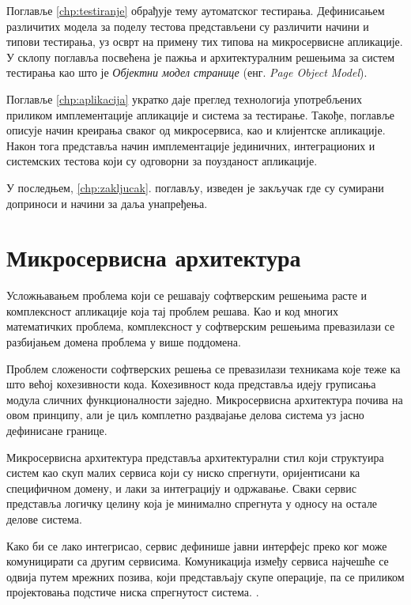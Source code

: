 \documentclass[12pt,oneside]{memoir}
\begin{document}
Поглавље \ref{chp:testiranje} обрађује тему аутоматског тестирања. Дефинисањем различитих модела за поделу тестова представљени су различити начини и типови тестирања, уз осврт на примену тих типова на микросервисне апликације. У склопу поглавља посвећена је пажња и архитектуралним решењима за систем тестирања као што је \textit{Објектни модел странице} (енг. \textit{Page Object Model}).

Поглавље \ref{chp:aplikacija} укратко даје преглед технологија употребљених приликом имплементације апликације и система за тестирање. Такође, поглавље описује начин креирања сваког од микросервиса, као и клијентске апликације. Након тога представља начин имплементације јединичних, интеграционих и системских тестова који су одговорни за поузданост апликације.

 У последњем, \ref{chp:zakljucak}. поглављу, изведен је закључак где су сумирани доприноси и начини за даља унапређења.



\chapter{Микросервисна архитектура}
\label{chp:mikroservisi}

Усложњавањем проблема који се решавају софтверским решењима расте и комплексност апликације која тај проблем решава. Као и код многих математичких проблема, комплексност у софтверским решењима превазилази се разбијањем домена проблема у више поддомена. 

Проблем сложености софтверских решења се превазилази техникама које теже ка што већој кохезивности кода. Кохезивност кода представља идеју груписања модула сличних функционалности заједно. Микросервисна архитектура почива на овом принципу, али је циљ комплетно раздвајање делова система уз јасно дефинисане границе. 

Микросервисна архитектура представља архитектурални стил који структуира систем као скуп малих сервиса који су ниско спрегнути, оријентисани ка специфичном домену, и лаки за интеграцију и одржавање. Сваки сервис представља логичку целину која је минимално спрегнута у односу на остале делове система.

Како би се лако интегрисао, сервис дефинише јавни интерфејс преко ког може комуницирати са другим сервисима. Комуникација између сервиса најчешће се одвија путем мрежних позива, који представљају скупе операције, па се приликом пројектовања подстиче ниска спрегнутост система. \cite{microservicesBook}.
\end{document}
